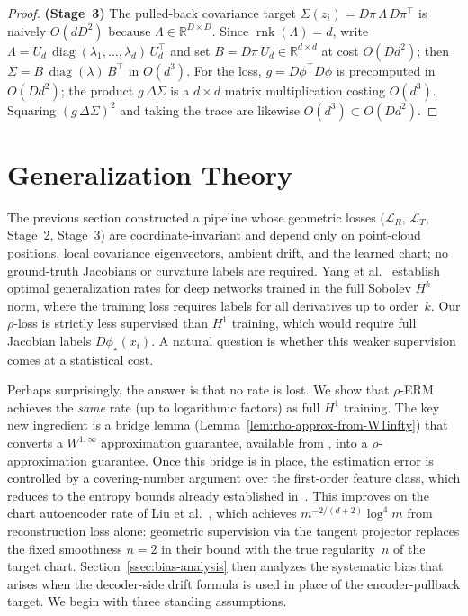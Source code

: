 \documentclass[11pt]{article}
\newcommand{\R}{\mathbb{R}}
\newcommand{\cL}{\mathcal{L}}
\newcommand{\diag}{\operatorname{diag}}
\newcommand{\rnk}{\operatorname{rnk}}
\begin{document}
\begin{proof}
\smallskip
  \textbf{(Stage~3)}
  The pulled-back covariance target
  $\Sigma(z_i) = D\pi\,\Lambda\,D\pi^\top$ is naively $O(dD^2)$
  because $\Lambda\in\R^{D\times D}$.
  Since $\rnk(\Lambda)=d$, write
  $\Lambda = U_d\,\diag(\lambda_1,\dots,\lambda_d)\,U_d^\top$
  and set $B = D\pi\,U_d\in\R^{d\times d}$ at cost $O(Dd^2)$;
  then $\Sigma = B\,\diag(\lambda)\,B^\top$ in $O(d^3)$.
  For the loss, $g = D\phi^\top D\phi$ is precomputed in $O(Dd^2)$;
  the product $g\,\Delta\Sigma$ is a $d\times d$ matrix
  multiplication costing $O(d^3)$.
  Squaring $(g\,\Delta\Sigma)^2$ and taking the trace are
  likewise $O(d^3) \subset O(Dd^2)$.
\end{proof}


\section{Generalization Theory}\label{sec:generalization}

The previous section constructed a pipeline
whose geometric losses ($\cL_R$, $\cL_T$, Stage~2, Stage~3)
are coordinate-invariant and depend only on point-cloud
positions, local covariance eigenvectors, ambient drift,
and the learned chart; no ground-truth Jacobians or
curvature labels are required.
Yang et al.~\cite{yang2025deeperwiderperspectiveoptimal} establish
optimal generalization rates for deep networks trained in the full
Sobolev $H^k$ norm, where the training loss requires labels for all
derivatives up to order~$k$.
Our $\rho$-loss is strictly less supervised than $H^1$
training, which would require full Jacobian labels
$D\phi_\star(x_i)$.
A natural question is whether this weaker supervision comes at a
statistical cost.

Perhaps surprisingly, the answer is that no rate is lost.
We show that $\rho$-ERM achieves the \emph{same} rate (up to
logarithmic factors) as full $H^1$ training.
The key new ingredient is a bridge lemma
(Lemma~\ref{lem:rho-approx-from-W1infty}) that converts a
$W^{1,\infty}$ approximation guarantee, available from
\cite{yang2025deeperwiderperspectiveoptimal}, into a
$\rho$-approximation guarantee.
Once this bridge is in place, the estimation error is controlled
by a covering-number argument over the first-order feature class,
which reduces to the entropy bounds already established
in~\cite{yang2025deeperwiderperspectiveoptimal}.
This improves on the chart autoencoder
rate of Liu et
al.~\cite{liu2023deepnonparametricestimationintrinsic}, which
achieves $m^{-2/(d+2)}\log^4 m$ from reconstruction loss alone:
geometric supervision via the tangent projector replaces the
fixed smoothness $n=2$ in their bound with the true regularity~$n$
of the target chart.
Section~\ref{ssec:bias-analysis} then analyzes the systematic bias
that arises when the decoder-side drift formula is used in place of
the encoder-pullback target.
We begin with three standing assumptions.\label{ssec:assumptions}
\end{document}
